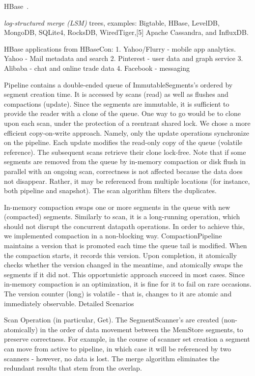 HBase~\cite{hbase}. 

\emph{log-structured merge (LSM)} trees, examples: Bigtable, HBase, LevelDB, MongoDB, SQLite4, RocksDB, WiredTiger,[5] Apache Cassandra, and InfluxDB.

HBase applications from HBaseCon:
1. Yahoo/Flurry - mobile app analytics. Yahoo - Mail metadata and search 
2. Pinterest - user data and graph service
3. Alibaba - chat and online trade data
4. Facebook - messaging

Pipeline contains a double-ended queue of ImmutableSegments’s ordered by segment creation time. It is accessed by scans (read) as well as flushes and compactions (update). Since the segments are immutable, it is sufficient to provide the reader with a clone of the queue. One way to go would be to clone upon each scan, under the protection of a reentrant shared lock. We chose a more efficient copy-on-write approach. Namely, only the update operations synchronize on the pipeline. Each update modifies the read-only copy of the queue (volatile reference). The subsequent scans retrieve their clone lock-free. Note that if some segments are removed from the queue by in-memory compaction or disk flush in parallel with an ongoing scan, correctness is not affected because the data does not disappear. Rather, it may be referenced from multiple locations (for instance, both pipeline and snapshot). The scan algorithm filters the duplicates. 

In-memory compaction swaps one or more segments in the queue with new (compacted) segments. Similarly to scan, it is a long-running operation, which should not disrupt the concurrent datapath operations. In order to achieve this, we implemented compaction in a non-blocking way. CompactionPipeline maintains a version that is promoted each time the queue tail is modified. When the compaction starts, it records this version. Upon completion, it atomically checks whether the version changed in the meantime, and atomically swaps the segments if it did not. This opportunistic approach succeed in most cases. Since in-memory compaction is an optimization, it is fine for it to fail on rare occasions. The version counter (long) is volatile - that is, changes to it are atomic and immediately observable. 
Detailed Scenarios

Scan Operation (in particular, Get). The SegmentScanner’s are created (non-atomically) in the order of data movement between the MemStore segments, to preserve correctness. For example, in the course of scanner set creation a segment can move from active to pipeline, in which case it will be referenced by two scanners - however, no data is lost. The merge algorithm eliminates the redundant results that stem from the overlap.


